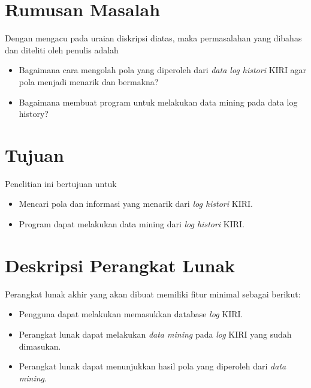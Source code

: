 \documentclass[a4paper,twoside]{article}
\begin{document}
\section{Rumusan Masalah}
Dengan mengacu pada uraian diskripsi diatas, maka permasalahan yang dibahas dan diteliti oleh penulis adalah
\begin{itemize}
	\item Bagaimana cara mengolah pola yang diperoleh dari \textsl{data log histori}  KIRI agar pola menjadi menarik dan bermakna?
	\item Bagaimana membuat program untuk melakukan data mining pada data log history?
\end{itemize}

\section{Tujuan}
Penelitian ini bertujuan untuk 
\begin{itemize}
	\item Mencari pola dan informasi yang menarik dari \textsl{log histori} KIRI.
	\item Program dapat melakukan data mining dari \textsl{log histori} KIRI.
\end{itemize}

\section{Deskripsi Perangkat Lunak}
Perangkat lunak akhir yang akan dibuat memiliki fitur minimal sebagai berikut:
\begin{itemize}
	\item Pengguna dapat melakukan memasukkan database \textsl{log} KIRI.
	\item Perangkat lunak dapat melakukan \textsl{data mining} pada \textsl{log} KIRI yang sudah dimasukan.
	\item Perangkat lunak dapat menunjukkan hasil pola yang diperoleh dari \textsl{data mining}.
\end{itemize}
\end{document}
